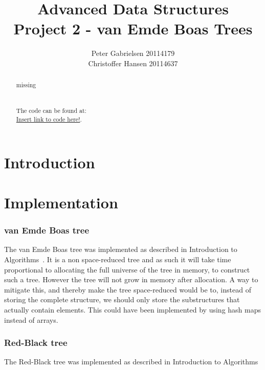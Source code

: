 \documentclass[a4paper,oneside,article,11pt]{memoir}
\title{Advanced Data Structures \\ Project 2 - van Emde Boas Trees}
\author{Peter Gabrielsen 20114179 \\
Christoffer Hansen 20114637}
\begin{document}
\begin{titlingpage}
\clearpage

\maketitle
\thispagestyle{empty}

\begin{abstract}
missing
\\
\\
\\
The code can be found at: \\\url{Insert link to code here!}.
\end{abstract}
\end{titlingpage}

\pagebreak

\tableofcontents

\pagebreak

\chapter{Introduction}


\chapter{Implementation}
\label{cpt:implementation}


\subsection{van Emde Boas tree}
The van Emde Boas tree was implemented as described in Introduction to Algorithms~\cite{clrs}. It is a non space-reduced tree and as such it will take time proportional to allocating the full universe of the tree in memory, to construct such a tree. However the tree will not grow in memory after allocation. A way to mitigate this, and thereby make the tree space-reduced would be to, instead of storing the complete structure, we should only store the substructures that actually contain elements. This could have been implemented by using hash maps instead of arrays.


\subsection{Red-Black tree}
The Red-Black tree was implemented as described in Introduction to Algorithms~\cite{clrs}
\end{document}

